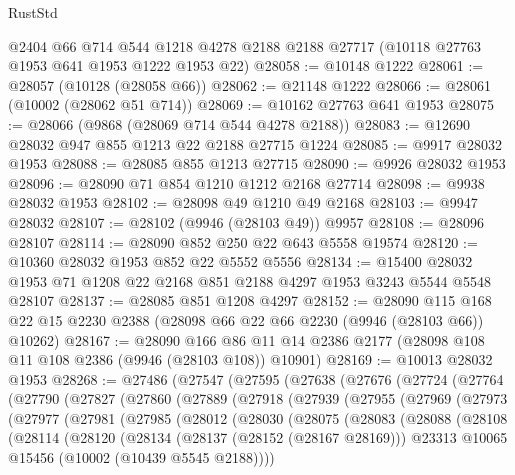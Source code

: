 \begin{lexlean}{RustStd}
\begin{coremodule}
    @2404
    @66
    @714
    @544
    @1218
    @4278
    @2188
    @2188
    @27717
    (@10118 @27763 @1953 @641 @1953 @1222 @1953 @22)
@28058 := @10148 @1222
@28061 := @28057 (@10128 (@28058 @66))
@28062 := @21148 @1222
@28066 := @28061 (@10002 (@28062 @51 @714))
@28069 := @10162 @27763 @641 @1953
@28075 := @28066 (@9868 (@28069 @714 @544 @4278 @2188))
@28083 := @12690 @28032 @947 @855 @1213 @22 @2188 @27715 @1224
@28085 := @9917 @28032 @1953
@28088 := @28085 @855 @1213 @27715
@28090 := @9926 @28032 @1953
@28096 := @28090 @71 @854 @1210 @1212 @2168 @27714
@28098 := @9938 @28032 @1953
@28102 := @28098 @49 @1210 @49 @2168
@28103 := @9947 @28032
@28107 := @28102 (@9946 (@28103 @49)) @9957
@28108 := @28096 @28107
@28114 := @28090 @852 @250 @22 @643 @5558 @19574
@28120 := @10360 @28032 @1953 @852 @22 @5552 @5556
@28134 := @15400 @28032 @1953 @71 @1208 @22 @2168 @851 @2188 @4297 @1953 @3243 @5544 @5548 @28107
@28137 := @28085 @851 @1208 @4297
@28152 := @28090
    @115
    @168
    @22
    @15
    @2230
    @2388
    (@28098 @66 @22 @66 @2230 (@9946 (@28103 @66)) @10262)
@28167 := @28090
    @166
    @86
    @11
    @14
    @2386
    @2177
    (@28098 @108 @11 @108 @2386 (@9946 (@28103 @108)) @10901)
@28169 := @10013 @28032 @1953
@28268 := @27486
    (@27547
      (@27595
        (@27638
          (@27676
            (@27724
              (@27764
                (@27790
                  (@27827
                    (@27860
                      (@27889
                        (@27918
                          (@27939
                            (@27955
                              (@27969
                                (@27973
                                  (@27977
                                    (@27981
                                      (@27985
                                        (@28012
                                          (@28030
                                            (@28075
                                              (@28083
                                                (@28088
                                                  (@28108
                                                    (@28114
                                                      (@28120
                                                        (@28134
                                                          (@28137 (@28152 (@28167 @28169)))
                                                          @23313
                                                          @10065
                                                          @15456
                                                          (@10002 (@10439 @5545 @2188))))

\end{coremodule}
\end{lexlean}
